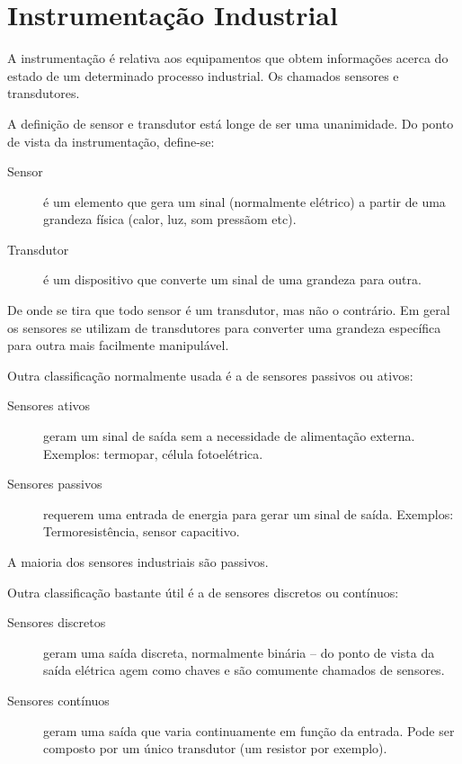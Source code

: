 \chapter{Instrumentação Industrial}

A instrumentação é relativa aos equipamentos que obtem informações acerca do estado de um determinado processo industrial. Os chamados sensores e transdutores.

A definição de sensor e transdutor está longe de ser uma unanimidade. Do ponto de vista da instrumentação, define-se:
\begin{description}
  \item[Sensor] é um elemento que gera um sinal (normalmente elétrico) a partir de uma grandeza física (calor, luz, som pressãom etc).
  \item[Transdutor] é um dispositivo que converte um sinal de uma grandeza para outra.
\end{description}

De onde se tira que todo sensor é um transdutor, mas não o contrário. Em geral os sensores se utilizam de transdutores para converter uma grandeza específica para outra mais facilmente manipulável.

Outra classificação normalmente usada é a de sensores passivos ou ativos:
\begin{description}
  \item[Sensores ativos] geram um sinal de saída sem a necessidade de alimentação externa. Exemplos: termopar, célula fotoelétrica.
  \item[Sensores passivos] requerem uma entrada de energia para gerar um sinal de saída. Exemplos: Termoresistência, sensor capacitivo.
\end{description}

A maioria dos sensores industriais são passivos.

Outra classificação bastante útil é a de sensores discretos ou contínuos:

\begin{description}
  \item[Sensores discretos] geram uma saída discreta, normalmente binária -- do ponto de vista da saída elétrica agem como chaves e são comumente chamados de sensores.
  \item[Sensores contínuos] geram uma saída que varia continuamente em função da entrada. Pode ser composto por um único transdutor (um resistor por exemplo).
\end{description}

